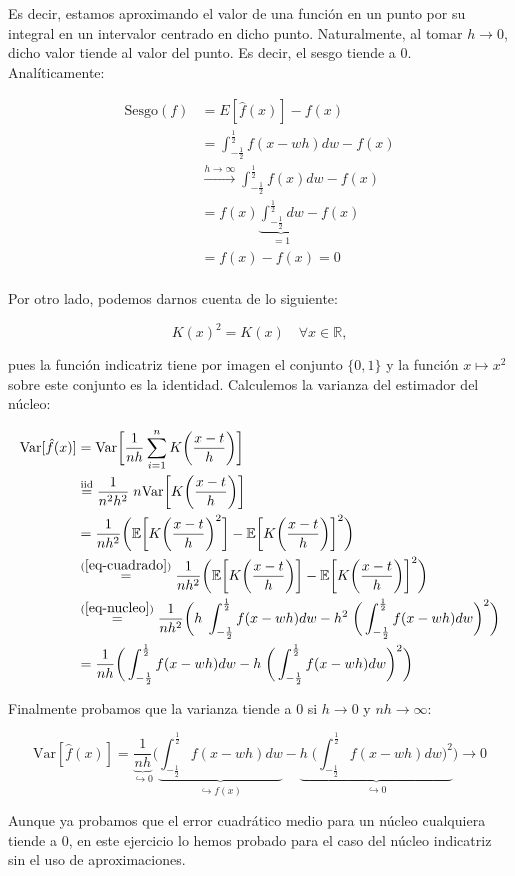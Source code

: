 \documentclass[a4paper]{article}
\newcommand{\R}{\mathbb{R}}
\newcommand{\E}{\mathbb{E}}
\newcommand{\Var}{\text{Var}}
\begin{document}
Es decir, estamos aproximando el valor de una función en un punto por su integral en un intervalor centrado en dicho punto. Naturalmente, al tomar $h \rightarrow 0$, dicho valor tiende al valor del punto. Es decir, el sesgo tiende a $0$. Analíticamente:

\begin{align*}
	\text{Sesgo}(f) & = E [ \hat f(x) ] - f(x) \\
	& = \int_{-\frac{1}{2}}^{\frac{1}{2}} f(x - wh) dw - f(x) \\
	& \stackrel{h \rightarrow \infty}{\longrightarrow} \int_{-\frac{1}{2}}^{\frac{1}{2}} f(x) dw - f(x) \\
	& =  f(x) \underbrace{\int_{-\frac{1}{2}}^{\frac{1}{2}} dw}_{= 1} - f(x) \\
	& =  f(x) - f(x) = 0 \\
\end{align*}

Por otro lado, podemos darnos cuenta de lo siguiente:

\begin{equation}
	\label{eq-cuadrado}
	K(x)^2 = K(x) \quad \forall x \in \R,
\end{equation}

pues la función indicatriz tiene por imagen el conjunto $\{0,1\}$ y la función $x \mapsto x^2$ sobre este conjunto es la identidad. Calculemos la varianza del estimador del núcleo:

\begin{align*}
	\Var [ \hat f(x)] & = \Var \bigg[ \frac{1}{nh} \sum_{i=1}^n K\bigg(\frac{x - t}{h}\bigg) \bigg] \\
	& \stackrel{\text{iid}}{=} \frac{1}{n^2 h^2} \; n \Var \bigg[ K\bigg(\frac{x - t}{h}\bigg) \bigg] \\
	& = \frac{1}{n h^2} \bigg( \E \bigg[ K\bigg(\frac{x - t}{h}\bigg)^2 \bigg] - \E \bigg[ K\bigg(\frac{x - t}{h}\bigg) \bigg]^2 \bigg)  \\
	& \stackrel{(\ref{eq-cuadrado})}{=} \frac{1}{n h^2} \bigg( \E \bigg[ K\bigg(\frac{x - t}{h}\bigg) \bigg] - \E \bigg[ K\bigg(\frac{x - t}{h}\bigg) \bigg]^2 \bigg)  \\
	& \stackrel{(\ref{eq-nucleo})}{=} \frac{1}{n h^2} \bigg( h \; \int_{-\frac{1}{2}}^{\frac{1}{2}} f(x - wh) dw - h^2 \; \bigg( \int_{-\frac{1}{2}}^{\frac{1}{2}} f(x - wh) dw\bigg) ^2 \bigg) \\
	& = \frac{1}{n h} \bigg( \int_{-\frac{1}{2}}^{\frac{1}{2}} f(x - wh) dw - h \; \bigg( \int_{-\frac{1}{2}}^{\frac{1}{2}} f(x - wh) dw\bigg) ^2 \bigg) \\
\end{align*}

Finalmente probamos que la varianza tiende a $0$ si $h \rightarrow 0$ y $nh \rightarrow \infty$:

\[
	\Var [ \hat f(x)] = \underbrace{\frac{1}{n h}}_{\hookrightarrow 0} \bigg( \underbrace{\int_{-\frac{1}{2}}^{\frac{1}{2}} f(x - wh) dw}_{\hookrightarrow f(x)} - \underbrace{h \; \bigg( \int_{-\frac{1}{2}}^{\frac{1}{2}} f(x - wh) dw\bigg) ^2}_{\hookrightarrow 0} \bigg)
	\longrightarrow 0
\]

Aunque ya probamos que el error cuadrático medio para un núcleo cualquiera tiende a $0$, en este ejercicio lo hemos probado para el caso del núcleo indicatriz sin el uso de aproximaciones.
\end{document}
